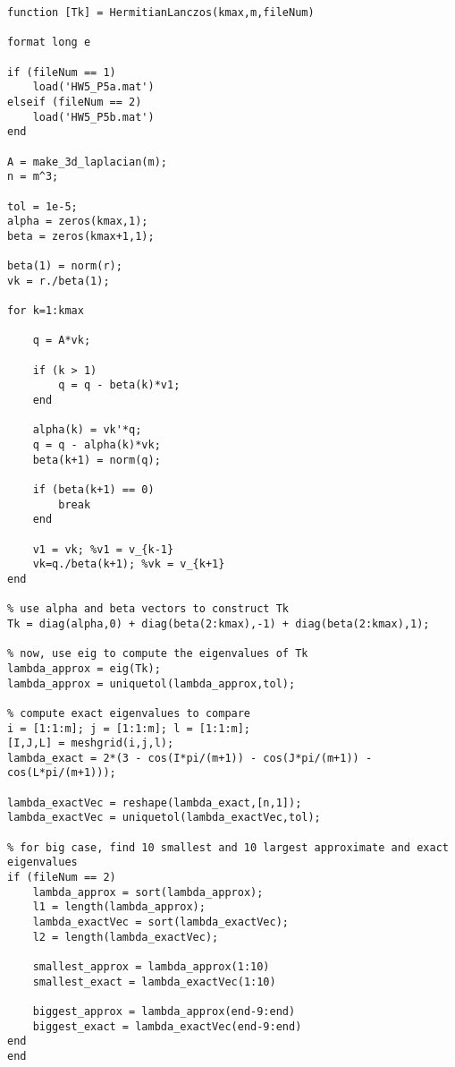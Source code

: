 \documentclass[12pt]{article}
\begin{document}
\newpage
\lstset{language=matlab,frame=single}
\begin{lstlisting}[caption= Matlab Code to Compute Approximate Eigenvalue using the Hermitian Lanczos Process]
function [Tk] = HermitianLanczos(kmax,m,fileNum)

format long e

if (fileNum == 1)
    load('HW5_P5a.mat')
elseif (fileNum == 2)
    load('HW5_P5b.mat')
end

A = make_3d_laplacian(m);
n = m^3;

tol = 1e-5;
alpha = zeros(kmax,1);
beta = zeros(kmax+1,1);

beta(1) = norm(r);
vk = r./beta(1);

for k=1:kmax
    
    q = A*vk;
    
    if (k > 1)
        q = q - beta(k)*v1;
    end
    
    alpha(k) = vk'*q;
    q = q - alpha(k)*vk;
    beta(k+1) = norm(q);
    
    if (beta(k+1) == 0)
        break
    end
    
    v1 = vk; %v1 = v_{k-1}
    vk=q./beta(k+1); %vk = v_{k+1}
end

% use alpha and beta vectors to construct Tk
Tk = diag(alpha,0) + diag(beta(2:kmax),-1) + diag(beta(2:kmax),1);

% now, use eig to compute the eigenvalues of Tk
lambda_approx = eig(Tk);
lambda_approx = uniquetol(lambda_approx,tol);

% compute exact eigenvalues to compare
i = [1:1:m]; j = [1:1:m]; l = [1:1:m];
[I,J,L] = meshgrid(i,j,l);
lambda_exact = 2*(3 - cos(I*pi/(m+1)) - cos(J*pi/(m+1)) - cos(L*pi/(m+1)));

lambda_exactVec = reshape(lambda_exact,[n,1]);
lambda_exactVec = uniquetol(lambda_exactVec,tol);

% for big case, find 10 smallest and 10 largest approximate and exact eigenvalues
if (fileNum == 2)
    lambda_approx = sort(lambda_approx);
    l1 = length(lambda_approx);
    lambda_exactVec = sort(lambda_exactVec);
    l2 = length(lambda_exactVec);
    
    smallest_approx = lambda_approx(1:10)
    smallest_exact = lambda_exactVec(1:10)
    
    biggest_approx = lambda_approx(end-9:end)
    biggest_exact = lambda_exactVec(end-9:end)
end
end
\end{lstlisting}
\end{document}
